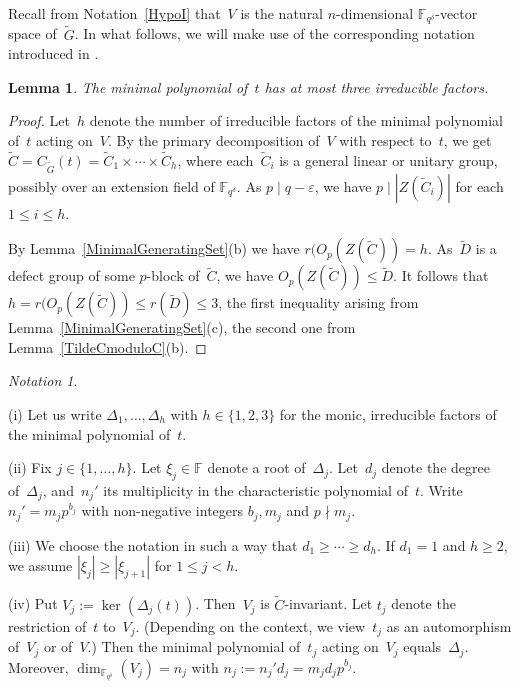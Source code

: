 \documentclass[12pt]{amsart}
\newtheorem{lem}[thm]{Lemma}
\theoremstyle{theorem}
\theoremstyle{definition}
\theoremstyle{remark}
\newtheorem{notn}[thm]{Notation}
\begin{document}
Recall from Notation~\ref{HypoI} that~$V$ is the natural $n$-dimensional 
$\mathbb{F}_{q^\delta}$-vector space of~$\tilde{G}$. In what follows, we will
make use of the corresponding notation introduced in 
\cite[Subsections~$3.1$,~$3.2$,~$3.4$]{HL25}. 

\addtocounter{thm}{1}
\begin{lem}
\label{MinimalPolynomial}
The minimal polynomial of~$t$ has at most three irreducible factors.
\end{lem}
\begin{proof}
Let~$h$ denote the number of irreducible factors of the minimal polynomial 
of~$t$ acting on~$V$. By the primary decomposition of~$V$ with respect to~$t$, 
we get $\tilde{C} = C_{\tilde{G}}( t ) = 
\tilde{C}_{1} \times \cdots \times \tilde{C}_{h}$, where
each~$\tilde{C}_i$ is a general linear or unitary group, possibly over an
extension field of $\mathbb{F}_{q^{\delta}}$. As $p \mid q - \varepsilon$, we
have $p \mid |Z( \tilde{C}_i )|$ for each $1 \leq i \leq h$.

By Lemma~\ref{MinimalGeneratingSet}(b) we have $r( O_p( Z( \tilde{C} ) ) = h$.
As~$\tilde{D}$ is a defect group of some $p$-block of~$\tilde{C}$, we have 
$O_p( Z( \tilde{C} ) ) \leq \tilde{D}$.
It follows that $h = r( O_p( Z( \tilde{C} ) ) \leq r( \tilde{D} ) 
\leq 3$, the first inequality arising from Lemma~\ref{MinimalGeneratingSet}(c),
the second one from Lemma~\ref{TildeCmoduloC}(b).
\end{proof}

\begin{notn}
\label{HypoIV}
{\rm
(i) Let us write $\Delta_1, \ldots , \Delta_h$ with $h \in \{ 1, 2, 3 \}$ for
the monic, irreducible factors of the minimal polynomial of~$t$.

(ii)
Fix $j \in \{ 1, \ldots , h \}$.
Let $\xi_j \in \mathbb{F}$ denote a root of~$\Delta_j$. Let~$d_j$ denote the 
degree of~$\Delta_j$, and~$n_j'$ its multiplicity in the characteristic 
polynomial of~$t$. Write $n_j' = m_jp^{b_j}$ with non-negative integers $b_j, 
m_j$ and $p \nmid m_j$.

(iii) We choose the notation in such a way that
$d_1 \geq \cdots \geq d_{h}$. If $d_1 = 1$ and $h \geq 2$, we assume
$|\xi_j| \geq |\xi_{j+1}|$ for $1 \leq j < h$.

(iv) Put $V_j := \ker( \Delta_j( t ) )$. Then~$V_j$ is $\tilde{C}$-invariant. Let 
$t_j$ denote the restriction of~$t$ to~$V_j$. (Depending on the context, we 
view~$t_j$ as an automorphism of~$V_j$ or of~$V$.) Then the minimal polynomial 
of~$t_j$ acting on~$V_j$ equals~$\Delta_j$. Moreover, 
$\dim_{\mathbb{F}_{q^\delta}}( V_j ) = n_j$ with $n_j := n_j'd_j = m_jd_jp^{b_j}$.
}\hfill{\textsquare}
\end{notn}
\end{document}
